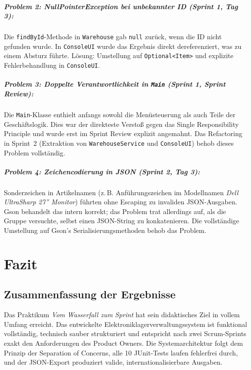 \documentclass[12pt, a4paper, twoside]{report}
\begin{document}
{\paragraph{Problem 2: NullPointerException bei unbekannter ID (Sprint 1, Tag 3):}
Die \texttt{findById}-Methode in \texttt{Warehouse} gab \texttt{null} zurück,
wenn die ID nicht gefunden wurde. In \texttt{ConsoleUI} wurde das Ergebnis
direkt dereferenziert, was zu einem Absturz führte. Lösung: Umstellung auf
\texttt{Optional<Item>} und explizite Fehlerbehandlung in \texttt{ConsoleUI}.

\paragraph{Problem 3: Doppelte Verantwortlichkeit in \texttt{Main} (Sprint 1, Sprint Review):}
Die \texttt{Main}-Klasse enthielt anfangs sowohl die Menüsteuerung als auch
Teile der Geschäftslogik. Dies war der direkteste Verstoß gegen das
Single Responsibility Principle und wurde erst im Sprint Review explizit angemahnt.
Das Refactoring in Sprint~2 (Extraktion von \texttt{WarehouseService} und
\texttt{ConsoleUI}) behob dieses Problem vollständig.

\paragraph{Problem 4: Zeichencodierung in JSON (Sprint 2, Tag 3):}
Sonderzeichen in Artikelnamen (z.\,B. Anführungszeichen im Modellnamen
\textit{Dell UltraSharp 27'' Monitor}) führten ohne Escaping zu invaliden
JSON-Ausgaben. Gson behandelt das intern korrekt; das Problem trat allerdings
auf, als die Gruppe versuchte, selbst einen JSON-String zu konkatenieren.
Die vollständige Umstellung auf Gson's Serialisierungsmethoden behob das Problem.

\chapter{Fazit}
\label{chap:fazit}

\section{Zusammenfassung der Ergebnisse}

Das Praktikum \textit{Vom Wasserfall zum Sprint} hat sein didaktisches Ziel in vollem
Umfang erreicht. Das entwickelte Elektroniklagerverwaltungssystem ist funktional vollständig,
technisch sauber strukturiert und entspricht nach zwei Scrum-Sprints exakt den
Anforderungen des Product Owners. Die Systemarchitektur folgt dem Prinzip der Separation
of Concerns, alle 10 JUnit-Tests laufen fehlerfrei durch, und der JSON-Export produziert
valide, internationalisierbare Ausgaben.

}
\end{document}
